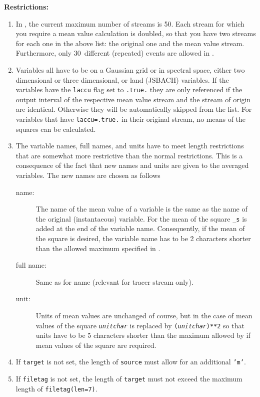 {\bf Restrictions:}

\begin{enumerate}

\item In \echam, the current maximum number of streams is 50.
      Each stream for which you require a mean value calculation is doubled,
      so that you have two streams for each one in the above  list:
      the original one and the mean value stream. Furthermore, only
      30~different (repeated) events are allowed in \echam. 

\item
\label{item:applicable_vars}

Variables all have to be on a Gaussian grid or in spectral space,
either two dimensional or three dimensional, or land (JSBACH) variables.
If the variables have the
{\tt laccu} flag set to {\tt .true.} they are only referenced if the output
interval of the respective mean value stream and the stream of origin
are identical. Otherwise they will be automatically skipped from the list.
For variables that have {\tt laccu=.true.} in their original stream,
no means of the squares can be calculated.

\item

The variable names, full names, and units have to meet
length restrictions that are somewhat more restrictive than the normal \echam{} 
restrictions. This is a consequence of the fact that
new names and units are given to the averaged
variables. The new names are chosen as follows
\begin{description}
\item [name:] The name of the mean value of a variable is the same as
  the name of the original (instantaeous) variable. 
For the mean of the
square {\tt \_s} is 
added at the end of the variable name. Consequently, if the mean of the 
square is desired, the variable name has to be 2 characters shorter than the
allowed maximum specified in \echam.
\item [full name:] Same as for name (relevant for tracer stream only).
\item [unit:] Units of mean values are unchanged of course, but in the case of
mean values of the square {\tt \it unitchar} is replaced by 
{\tt ({\it unitchar})**2} so that units have to be 5 characters shorter than
the maximum allowed by \echam{} if mean values of the square are required.
\end{description}

\item If \texttt{target} is not set,
      the length of \texttt{source} must 
      allow for an additional {\tt 'm'}.

\item If \texttt{filetag} is not set, the length of \texttt{target}
  must not exceed the maximum length of \texttt{filetag(len=7)}. 
\end{enumerate}

